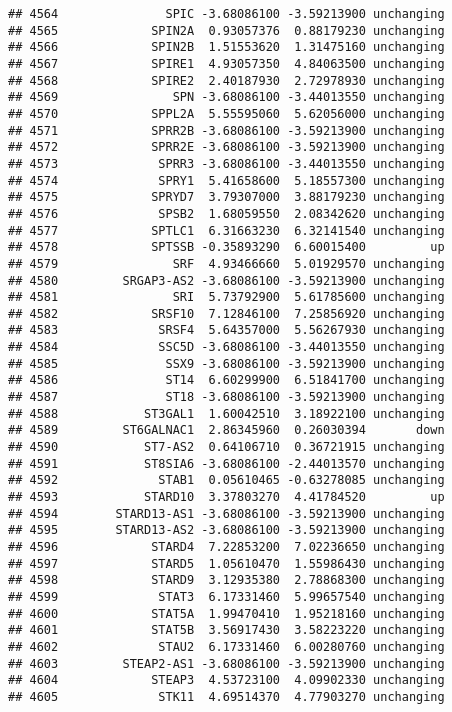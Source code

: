 \documentclass[]{article}
\begin{document}
\begin{verbatim}
## 4564               SPIC -3.68086100 -3.59213900 unchanging
## 4565             SPIN2A  0.93057376  0.88179230 unchanging
## 4566             SPIN2B  1.51553620  1.31475160 unchanging
## 4567             SPIRE1  4.93057350  4.84063500 unchanging
## 4568             SPIRE2  2.40187930  2.72978930 unchanging
## 4569                SPN -3.68086100 -3.44013550 unchanging
## 4570             SPPL2A  5.55595060  5.62056000 unchanging
## 4571             SPRR2B -3.68086100 -3.59213900 unchanging
## 4572             SPRR2E -3.68086100 -3.59213900 unchanging
## 4573              SPRR3 -3.68086100 -3.44013550 unchanging
## 4574              SPRY1  5.41658600  5.18557300 unchanging
## 4575             SPRYD7  3.79307000  3.88179230 unchanging
## 4576              SPSB2  1.68059550  2.08342620 unchanging
## 4577             SPTLC1  6.31663230  6.32141540 unchanging
## 4578             SPTSSB -0.35893290  6.60015400         up
## 4579                SRF  4.93466660  5.01929570 unchanging
## 4580         SRGAP3-AS2 -3.68086100 -3.59213900 unchanging
## 4581                SRI  5.73792900  5.61785600 unchanging
## 4582             SRSF10  7.12846100  7.25856920 unchanging
## 4583              SRSF4  5.64357000  5.56267930 unchanging
## 4584              SSC5D -3.68086100 -3.44013550 unchanging
## 4585               SSX9 -3.68086100 -3.59213900 unchanging
## 4586               ST14  6.60299900  6.51841700 unchanging
## 4587               ST18 -3.68086100 -3.59213900 unchanging
## 4588            ST3GAL1  1.60042510  3.18922100 unchanging
## 4589         ST6GALNAC1  2.86345960  0.26030394       down
## 4590            ST7-AS2  0.64106710  0.36721915 unchanging
## 4591            ST8SIA6 -3.68086100 -2.44013570 unchanging
## 4592              STAB1  0.05610465 -0.63278085 unchanging
## 4593            STARD10  3.37803270  4.41784520         up
## 4594        STARD13-AS1 -3.68086100 -3.59213900 unchanging
## 4595        STARD13-AS2 -3.68086100 -3.59213900 unchanging
## 4596             STARD4  7.22853200  7.02236650 unchanging
## 4597             STARD5  1.05610470  1.55986430 unchanging
## 4598             STARD9  3.12935380  2.78868300 unchanging
## 4599              STAT3  6.17331460  5.99657540 unchanging
## 4600             STAT5A  1.99470410  1.95218160 unchanging
## 4601             STAT5B  3.56917430  3.58223220 unchanging
## 4602              STAU2  6.17331460  6.00280760 unchanging
## 4603         STEAP2-AS1 -3.68086100 -3.59213900 unchanging
## 4604             STEAP3  4.53723100  4.09902330 unchanging
## 4605              STK11  4.69514370  4.77903270 unchanging

\end{verbatim}
\end{document}
